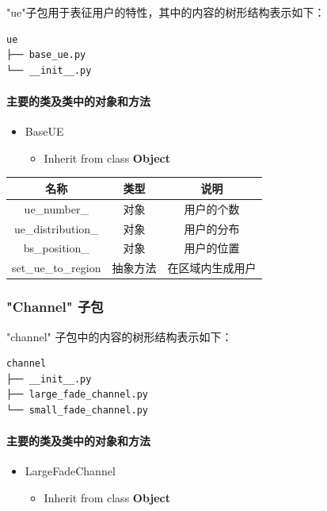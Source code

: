 \documentclass[11pt]{article}
\providecommand{\tightlist}{%
      \setlength{\itemsep}{0pt}\setlength{\parskip}{0pt}}
\begin{document}
"ue"子包用于表征用户的特性，其中的内容的树形结构表示如下：

\begin{verbatim}
ue
├── base_ue.py
└── __init__.py
\end{verbatim}

\paragraph{主要的类及类中的对象和方法}\label{ux4e3bux8981ux7684ux7c7bux53caux7c7bux4e2dux7684ux5bf9ux8c61ux548cux65b9ux6cd5-1}

\begin{itemize}
\tightlist
\item
  BaseUE

  \begin{itemize}
  \tightlist
  \item
    Inherit from class \textbf{Object}
  \end{itemize}
\end{itemize}

\begin{longtable}[c]{@{}ccc@{}}
\toprule
名称 & 类型 & 说明\tabularnewline
\midrule
\endhead
ue\_number\_ & 对象 & 用户的个数\tabularnewline
ue\_distribution\_ & 对象 & 用户的分布\tabularnewline
bs\_position\_ & 对象 & 用户的位置\tabularnewline
set\_ue\_to\_region & 抽象方法 & 在区域内生成用户\tabularnewline
\bottomrule
\end{longtable}

\subsubsection{"Channel" 子包}\label{channel-ux5b50ux5305}

"channel" 子包中的内容的树形结构表示如下：

\begin{verbatim}
channel
├── __init__.py
├── large_fade_channel.py
└── small_fade_channel.py
\end{verbatim}

\paragraph{主要的类及类中的对象和方法}\label{ux4e3bux8981ux7684ux7c7bux53caux7c7bux4e2dux7684ux5bf9ux8c61ux548cux65b9ux6cd5-2}

\begin{itemize}
\tightlist
\item
  LargeFadeChannel

  \begin{itemize}
  \tightlist
  \item
    Inherit from class \textbf{Object}
  \end{itemize}
\end{itemize}
\end{document}
